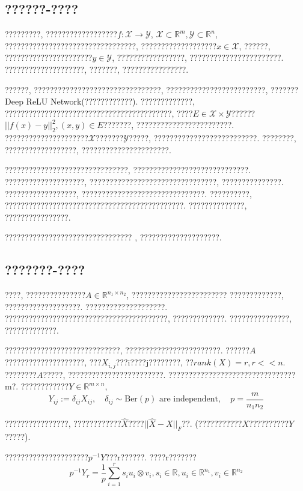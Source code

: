 \documentclass[lang=cn,11pt,a4paper]{elegantpaper}
\begin{document}
\subsection{??????-????}
\par ?????????, ??????????????????$f:\mathcal X \to \mathcal Y$, $\mathcal X \subset \mathbb R^m, \mathcal Y \subset \mathbb R^n$, ?????????????????????????????????, ???????????????????$x\in \mathcal X$, ??????, ??????????????????????$y\in \mathcal Y$, ?????????????????, ???????????????????????. ????????????????????, ???????, ????????????????.
\par ??????, ????????????????????????????????, ?????????????????????????, ???????Deep ReLU Network(????????????). 
?????????????, ??????????????????????????????????????????, ????$E\in \mathcal X \times \mathcal Y$??????$||f(x)-y||^2_2, (x,y)\in E$???????, ????????????????????????. ?????????????????????$\mathcal X$???????$\mathcal Y$?????, ??????????????????????????. ????????, ??????????????????, ??????????????????????\cite{Goldberg1992}.
\par ???????????????????????????????, ?????????????????????????????. ????????????????????, ????????????????????????????????, ???????????????. ??????????????????, ???????????????????????????????. ??????????, ?????????????????????????????????????????????. ??????????????, ????????????????.
\par ????????????????????????????????\cite{Candes2010} , ????????????????????. 
\subsection{???????-????}
\par ????, ???????????????$A\in \mathbb{R}^{n_1\times n_2}$, ???????????????????????? ?????????????, ???????????????????. ????????????????????. ???????????????????????????\cite{Candes2010}??????????????\cite{Eriksson2012}, ?????????????. ???????????????, ?????????????\cite{Candes2009}.
\par ?????????????????????????????, ????????????????????????\cite{Candes2010}. ??????$A$????????????????????, ???$X_{i,j}$???i????j????????, ??$rank(X)=r, r<<n$. ????????$A$?????, ????????????????????????. ????????????????????????????????m?. ????????????$Y\in \mathbb{R}^{m\times n}$,
\begin{equation}
	Y_{ij}:=\delta_{ij}X_{ij}, \quad \delta_{ij} \sim \text{Ber}(p) \text{ are independent}, \quad p=\dfrac{m}{n_1n_2}
\end{equation}
\par ????????????????, ????????????$\hat{X}$????$||\hat{X}-X||_F$??. (???????????$X$??????????$Y$?????).
\par ?????????????????????$p^{-1}Y$???r??????\cite{Recht2011}. ????r???????
\begin{equation}
	p^{-1}Y_r=\frac{1}{p}\sum_{i=1}^r s_i u_i \otimes v_i, s_i \in \mathbb R, u_i \in \mathbb R^{n_1}, v_i\in \mathbb R^{n_2}
\end{equation}
\end{document}
